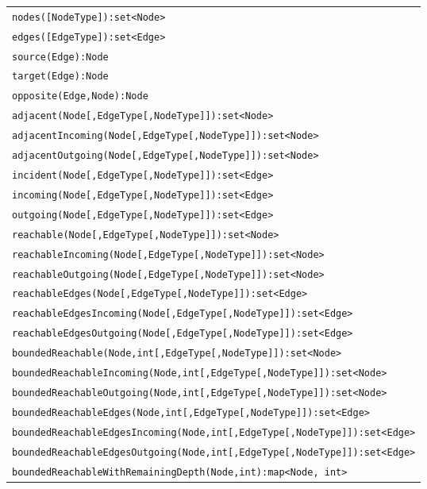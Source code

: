 \begin{table}[htbp]
\centering
\begin{tabular}{|l|}
\hline
\texttt{nodes([NodeType]):set<Node>}\\
\texttt{edges([EdgeType]):set<Edge>}\\
\hline
\texttt{source(Edge):Node}\\
\texttt{target(Edge):Node}\\
\texttt{opposite(Edge,Node):Node}\\
\hline
\texttt{adjacent(Node[,EdgeType[,NodeType]]):set<Node>}\\
\texttt{adjacentIncoming(Node[,EdgeType[,NodeType]]):set<Node>}\\
\texttt{adjacentOutgoing(Node[,EdgeType[,NodeType]]):set<Node>}\\
\texttt{incident(Node[,EdgeType[,NodeType]]):set<Edge>}\\
\texttt{incoming(Node[,EdgeType[,NodeType]]):set<Edge>}\\
\texttt{outgoing(Node[,EdgeType[,NodeType]]):set<Edge>}\\
\hline
\texttt{reachable(Node[,EdgeType[,NodeType]]):set<Node>}\\
\texttt{reachableIncoming(Node[,EdgeType[,NodeType]]):set<Node>}\\
\texttt{reachableOutgoing(Node[,EdgeType[,NodeType]]):set<Node>}\\
\texttt{reachableEdges(Node[,EdgeType[,NodeType]]):set<Edge>}\\
\texttt{reachableEdgesIncoming(Node[,EdgeType[,NodeType]]):set<Edge>}\\
\texttt{reachableEdgesOutgoing(Node[,EdgeType[,NodeType]]):set<Edge>}\\
\hline
\texttt{boundedReachable(Node,int[,EdgeType[,NodeType]]):set<Node>}\\
\texttt{boundedReachableIncoming(Node,int[,EdgeType[,NodeType]]):set<Node>}\\
\texttt{boundedReachableOutgoing(Node,int[,EdgeType[,NodeType]]):set<Node>}\\
\texttt{boundedReachableEdges(Node,int[,EdgeType[,NodeType]]):set<Edge>}\\
\texttt{boundedReachableEdgesIncoming(Node,int[,EdgeType[,NodeType]]):set<Edge>}\\
\texttt{boundedReachableEdgesOutgoing(Node,int[,EdgeType[,NodeType]]):set<Edge>}\\
\hline
\texttt{boundedReachableWithRemainingDepth(Node,int):map<Node, int>}\\

\end{tabular}
\end{table}
